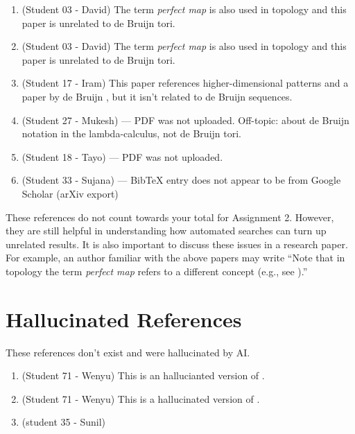 \documentclass{article}
\begin{document}
\begin{enumerate}[label=U\arabic*,noitemsep,nolistsep]
\item \cite{burke2003perfect} (Student 03 - David)
The term \emph{perfect map} is also used in topology and this paper is unrelated to de Bruijn tori.
\item \cite{ohta1977topologically} (Student 03 - David)
The term \emph{perfect map} is also used in topology and this paper is unrelated to de Bruijn tori.
\item \cite{widom1998two} (Student 17 - Iram)
This paper references higher-dimensional patterns and a paper by de Bruijn \cite{de1981algebraic}, but it isn't related to de Bruijn sequences.
\item \cite{ohtsuka1993proof} (Student 27 - Mukesh) --- PDF was not uploaded. Off-topic: about de Bruijn notation in the lambda-calculus, not de Bruijn tori.
\item \cite{engel2008stability} (Student 18 - Tayo) --- PDF was not uploaded.
\item \cite{klartag2024strongdataprocessinginequality} (Student 33 - Sujana) --- BibTeX entry does not appear to be from Google Scholar (arXiv export)
\end{enumerate}

These references do not count towards your total for Assignment 2.
However, they are still helpful in understanding how automated searches can turn up unrelated results.
It is also important to discuss these issues in a research paper.
For example, an author familiar with the above papers may write ``Note that in topology the term \emph{perfect map} refers to a different concept (e.g., see \cite{burke2003perfect}).''

\section{Hallucinated References}
\label{sec:hallucinated}

These references don't exist and were hallucinated by AI.

\begin{enumerate}[label=H\arabic*,noitemsep,nolistsep]
\item \cite{cock1988construction} (Student 71 - Wenyu)
This is an hallucianted version of \cite{cock1988toroidal}.
\item \cite{paterson1995perfect} (Student 71 - Wenyu)
This is a hallucinated version of \cite{paterson1994perfect}.
\item \cite{morano1998decoding} (student 35 - Sunil)
\end{enumerate}
\end{document}
